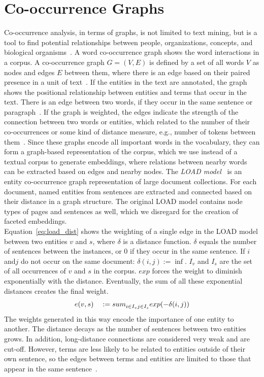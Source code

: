 \section{Co-occurrence Graphs}
\label{sec:graph}
Co-occurrence analysis, in terms of graphs, is not limited to text mining, but is a tool to find potential relationships between people, organizations, concepts, and biological organisms~. A word co-occurrence graph shows the word interactions in a corpus. A co-occurrence graph $G=(V,E)$ is defined by a set of all words $V$ as nodes and edges $E$ between them, where there is an edge based on their paired presence in a unit of text~. If the entities in the text are annotated, the graph shows the positional relationship between entities and terms that occur in the text. There is an edge between two words, if they occur in the same sentence or paragraph~. If the graph is weighted, the edges indicate the strength of the connection between two words or entities, which related to the number of their co-occurrences or some kind of distance measure, e.g., number of tokens between them~. Since these graphs encode all important words in the vocabulary, they can form a graph-based representation of the corpus, which we use instead of a textual corpus to generate embeddings, where relations between nearby words can be extracted based on edges and nearby nodes.
The \emph{LOAD model}~ is an entity co-occurrence graph representation of large document collections. For each document, named entities from sentences are extracted and connected based on their distance in a graph structure. The original LOAD model contains node types of pages and sentences as well, which we disregard for the creation of faceted embeddings. \\
Equation~\ref{eq:load_dist} shows the weighting of a single edge in the LOAD model between two entities $v$ and $s$, where $\delta $ is a distance function. $\delta $ equals the number of sentences between the instances, or $0$ if they occur in the same sentence.
If $i$ and$ j$ do not occur on the same document: $ \delta(i, j) := \inf$. $ I_{ v }$ and $I_{ s } $ are the set of all occurrences of $v$ and $s$ in the corpus. $exp$ forces the weight to diminish exponentially with the distance. Eventually, the sum of all these exponential distances creates the final weight.
\begin{equation}
e (v,s)\quad :=sum _{ i\in I_{ v } \\ j\in I_{ s } }^{  }{ exp } (-\delta (i,j))
\label{eq:load_dist}
\end{equation}
The weights generated in this way encode the importance of one entity to another. The distance decays as the number of sentences between two entities grows. In addition, long-distance connections are considered very weak and are cut-off. However, terms are less likely to be related to entities outside of their own sentence, so the edges between terms and entities are limited to those that appear in the same sentence~. 

